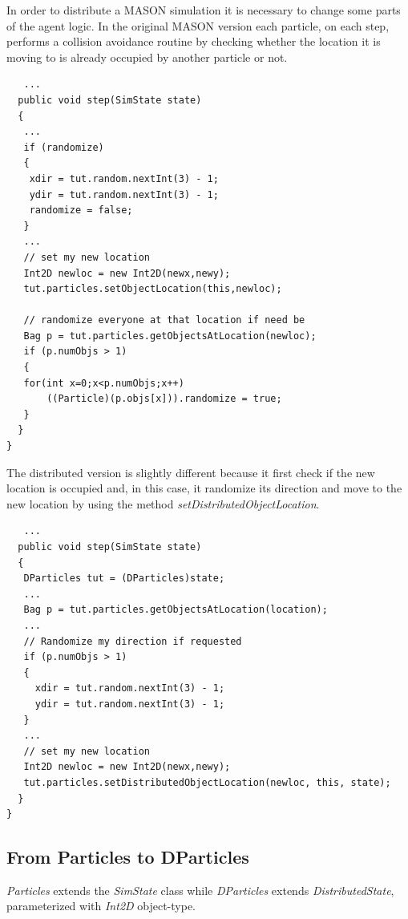 \documentclass[12pt]{article}
\begin{document}
In order to distribute a MASON simulation it is necessary to change some parts of the agent logic. In the original MASON version each particle, on each step, performs a collision avoidance routine by checking whether the location it is moving to is already occupied by another particle or not. 

\begin{lstlisting}
   ...
  public void step(SimState state)
  {
   ...
   if (randomize)
   {
    xdir = tut.random.nextInt(3) - 1;
    ydir = tut.random.nextInt(3) - 1;
	randomize = false;
   }
   ...
   // set my new location
   Int2D newloc = new Int2D(newx,newy);
   tut.particles.setObjectLocation(this,newloc);
   
   // randomize everyone at that location if need be
   Bag p = tut.particles.getObjectsAtLocation(newloc);
   if (p.numObjs > 1)
   {
   for(int x=0;x<p.numObjs;x++)
       ((Particle)(p.objs[x])).randomize = true;
   }
  }
}
\end{lstlisting}

The distributed version is slightly different because it first check if the new location is occupied and, in this case, it randomize its direction and move to the new location by using the method \textit{setDistributedObjectLocation}.


\begin{lstlisting}
   ...
  public void step(SimState state) 
  {
   DParticles tut = (DParticles)state;
   ...
   Bag p = tut.particles.getObjectsAtLocation(location);
   ...
   // Randomize my direction if requested
   if (p.numObjs > 1)
   {
     xdir = tut.random.nextInt(3) - 1;
     ydir = tut.random.nextInt(3) - 1;
   }
   ...
   // set my new location
   Int2D newloc = new Int2D(newx,newy);
   tut.particles.setDistributedObjectLocation(newloc, this, state);	
  }
}
\end{lstlisting}


\subsection{From Particles to DParticles}
\textit{Particles} extends the \textit{SimState} class  while \textit{DParticles} extends \textit{DistributedState}, parameterized with \textit{Int2D} object-type.
\end{document}

